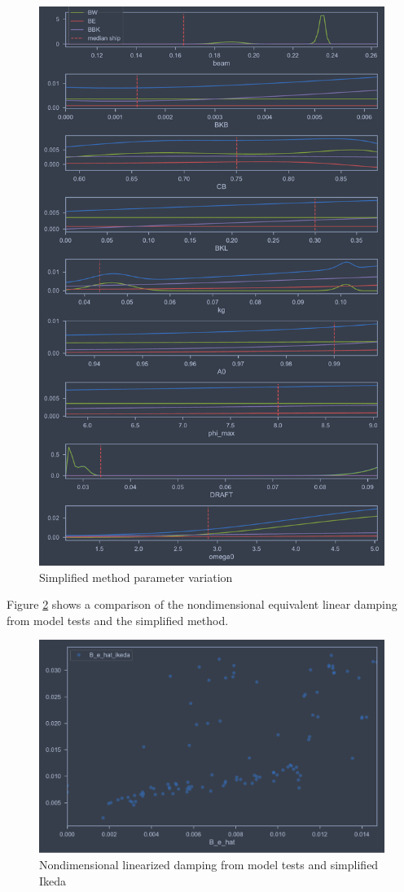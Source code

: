 \begin{figure}[H]
    \centering
    \includegraphics[width=0.9\columnwidth]{figures/ikeda_variation.pdf}
    \caption{Simplified method parameter variation}
    \label{fig:ikeda_variation}
\end{figure}

Figure \ref{fig:B_e_hat_ikeda} shows a comparison of the nondimensional equivalent linear damping from model tests and the simplified method.  

\begin{figure}[H]
    \centering
    \includegraphics[width=\columnwidth]{figures/B_e_hat_ikeda.pdf}
    \caption{Nondimensional linearized damping from model tests and simplified Ikeda}
    \label{fig:B_e_hat_ikeda}
\end{figure}

